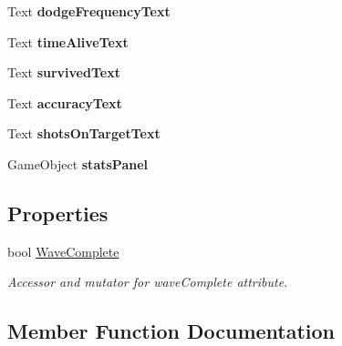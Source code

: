 \begin{DoxyCompactItemize}
\mbox{\label{class_evolution_controller_a21fc0e733ee44d2885d7e00b22f8460a}} 
Text {\bfseries dodge\+Frequency\+Text}
\item 
\mbox{\label{class_evolution_controller_a50f68dee9f616c26995473fc6a4de63f}} 
Text {\bfseries time\+Alive\+Text}
\item 
\mbox{\label{class_evolution_controller_a69190de729e5d8eef1d1cf46de2bc152}} 
Text {\bfseries survived\+Text}
\item 
\mbox{\label{class_evolution_controller_a7532ecd157f47efa09e365c868289676}} 
Text {\bfseries accuracy\+Text}
\item 
\mbox{\label{class_evolution_controller_a17182a83179f115f9708381d9b3d5ce9}} 
Text {\bfseries shots\+On\+Target\+Text}
\item 
\mbox{\label{class_evolution_controller_a0b18581ce864c56f877294da1f28e2b9}} 
Game\+Object {\bfseries stats\+Panel}
\end{DoxyCompactItemize}
\subsection*{Properties}
\begin{DoxyCompactItemize}
\item 
bool \mbox{\hyperlink{class_evolution_controller_a1649ff1641add0d5982e8eec77dc195d}{Wave\+Complete}}
\begin{DoxyCompactList}\small\item\em Accessor and mutator for wave\+Complete attribute. \end{DoxyCompactList}\end{DoxyCompactItemize}


\subsection{Member Function Documentation}
\mbox{\label{class_evolution_controller_a07a968a7b94e9afd6fa0dd6755b6d07c}} 

